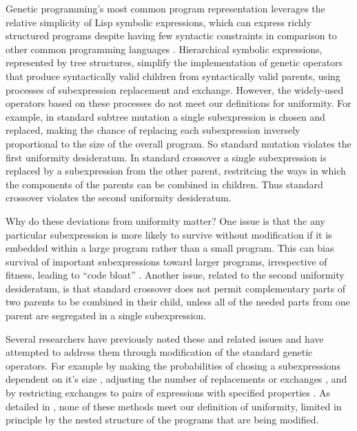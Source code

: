\documentclass[graybox]{svmult}
\begin{document}
Genetic programming's most common program representation leverages the relative simplicity of Lisp symbolic expressions, which can express richly structured programs despite having few syntactic constraints in comparison to other common programming languages \cite{koza:book}. Hierarchical symbolic expressions, represented by tree structures, simplify the implementation of genetic operators that produce syntactically valid children from syntactically valid parents, using processes of subexpression replacement and exchange. However, the widely-used operators based on these processes do not meet our definitions for uniformity. For example, in standard subtree mutation a single subexpression is chosen and replaced, making the chance of replacing each subexpression inversely proportional to the size of the overall program. So standard mutation violates the first uniformity desideratum. In standard crossover a single subexpression is replaced by a subexpression from the other parent, restritcing the ways in which the components of the parents can be combined in children. Thus standard crossover violates the second uniformity desideratum.

Why do these deviations from uniformity matter? One issue is that the any particular subexpression is more likely to survive without modification if it is embedded within a large program rather than a small program. This can bias survival of important subexpressions toward larger programs, irrespective of fitness, leading to ``code bloat'' \cite{Luke:2006:EC:FIXED}. Another issue, related to the second uniformity desideratum, is that standard crossover does not permit complementary parts of two parents to be combined in their child, unless all of the needed parts from one parent are segregated in a single subexpression.

Several researchers have previously noted these and related issues and have attempted to address them through modification of the standard genetic operators. For example by making the probabilities of chosing a subexpressions dependent on it's size \cite{koza:book,Helmuth:2011:GECCOcomp}, adjusting the number of replacements or exchanges \cite{vanbelle:2002:EuroGP:NOERROR}, and by restricting exchanges to pairs of expressions with specified properties \cite{page:CSRP-98-20,poli:1998:local,poli:2000:22par}. As detailed in \cite{Spector:2013:GPTP}, none of these methods meet our definition of uniformity, limited in principle by the nested structure of the programs that are being modified.
\end{document}
